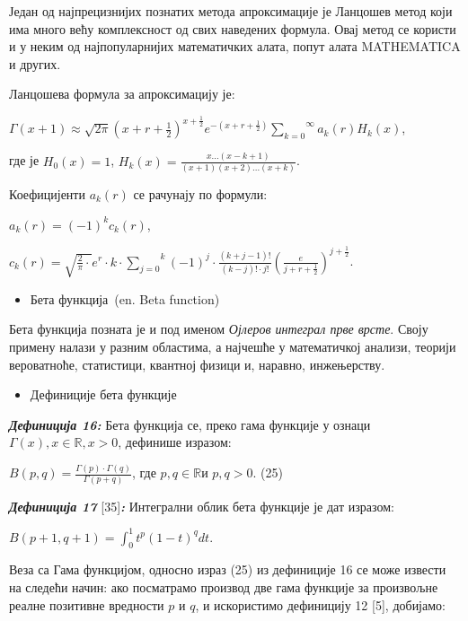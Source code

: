 Један од најпрецизнијих познатих метода апроксимације је Ланцошев метод
који има много већу комплексност од свих наведених формула. Овај метод
се користи и у неким од најпопуларнијих математичких алата, попут алата
MATHEMATICA и других.

Ланцошева формула за апроксимацију је:

\(\Gamma(x + 1) \approx \sqrt{2\pi}{(x + r + \frac{1}{2})}^{x + \frac{1}{2}}e^{- (x + r + \frac{1}{2})}\overset{\infty}{\sum_{k = 0}}a_{k}(r)H_{k}(x)\),

где је \(H_{0}(x) = 1\),
\(H_{k}(x) = \frac{x...(x - k + 1)}{(x + 1)(x + 2)...(x + k)}\).

Коефицијенти \(a_{k}(r)\) се рачунају по формули:

\(a_{k}(r) = {( - 1)}^{k}c_{k}(r)\),

\(c_{k}(r) = \sqrt{\frac{2}{\pi} \cdot}e^{r} \cdot k \cdot \overset{k}{\sum_{j = 0}}{( - 1)}^{j} \cdot \frac{(k + j - 1)!}{(k - j)! \cdot j!}\left( \frac{e}{j + r + \frac{1}{2}} \right)^{j + \frac{1}{2}}\).

\begin{itemize}
\item
  Бета функција~(en. Beta function)
\end{itemize}

Бета функција позната је и под именом \emph{Ојлеров интеграл прве
врсте}. Своју примену налази у разним областима, а најчешће у
математичкој анализи, теорији вероватноће, статистици, квантној физици
и, наравно, инжењерству.

\begin{itemize}
\item
  Дефиниције бета функције
\end{itemize}

\emph{\textbf{Дефиниција 16:}} Бета функција се, преко гама функције у
ознаци \(\Gamma(x),x\mathbb{\in R,}x > 0\), дефинише изразом:

\(B(p,q) = \frac{\Gamma(p) \cdot \Gamma(q)}{\Gamma(p + q)}\), где
\(p,q\mathbb{\in R}\)и \(p,q > 0\). (25)

\emph{\textbf{Дефиниција 17}} {[}35{]}\emph{\textbf{:}} Интегрални облик
бета функције је дат изразом:

\(B(p + 1,q + 1) = \int_{0}^{1}t^{p}{(1 - t)}^{q}dt\).

Веза са Гама функцијом, односно израз (25) из дефиниције 16 се може
извести на следећи начин: ако посматрамо производ две гама функције за
произвољне реалне позитивне вредности \(p\) и \(q\), и искористимо
дефиницију 12 {[}5{]}, добијамо:

